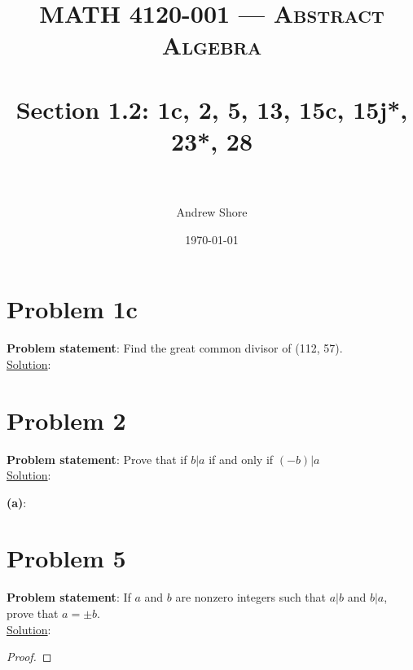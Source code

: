 \documentclass{article} %
\title{ 
\normalfont \normalsize 
\textsc{MATH 4120-001 --- Abstract Algebra} \\
\horrule{0.5pt} \\[0cm] %
\huge Section 1.2: 1c, 2, 5, 13, 15c, 15j*, 23*, 28  \\ %
\horrule{2pt} \\[0cm] %
}
\author{Andrew Shore} %
\date{\normalsize\today} %
\begin{document}
\maketitle %


\section*{Problem 1c}


\textbf{Problem statement}: Find the great common divisor of (112, 57).
\\

\underline{Solution}: 
\begin{addmargin}[1em]{0em}

\end{addmargin}    

\newpage

\section*{Problem 2}

\textbf{Problem statement}: Prove that if $b|a$ if and only if $(-b)|a$
\\

\underline{Solution}: 
\begin{addmargin}[1em]{0em}
\textbf{(a)}:
\begin{addmargin}[1em]{0em}
\end{addmargin}
\end{addmargin}

\newpage

\section*{Problem 5}


\textbf{Problem statement}: If $a$ and $b$ are nonzero integers such that $a|b$ and $b|a$, prove that $a = \pm b$.
\\

\underline{Solution}: 
\begin{addmargin}[1em]{0em}
\begin{proof}

\end{proof}
\end{addmargin}
\end{document}
